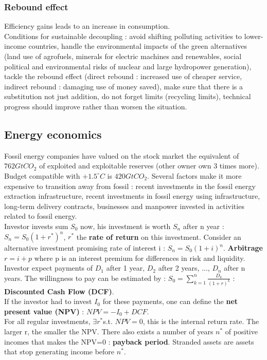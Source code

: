 \documentclass[../main.tex]{subfiles}
\begin{document}
\subsubsection{Rebound effect}
Efficiency gains leads to an increase in consumption. \\

Conditions for sustainable decoupling : avoid shifting polluting activities to lower-income countries, handle the environmental impacts of the green alternatives (land use of agrofuels, minerals for electric machines and renewables, social political and environmental risks of nuclear and large hydropower generation), tackle the rebound effect (direct rebound : increased use of cheaper service, indirect rebound : damaging use of money saved), make sure that there is a substitution not just addition, do not forget limits (recycling limits), technical progress should improve rather than worsen the situation.\\

\subsection{Energy economics}
Fossil energy companies have valued on the stock market the equivalent of $762GtCO_2$ of exploited and exploitable reserves (other owner own 3 times more). Budget compatible with $+1.5^\circ C$ is $420GtCO_2$. Several factors make it more expensive to transition away from fossil : recent investments in the fossil energy extraction infrastructure, recent investments in fossil energy using infrastructure, long-term delivery contracts, businesses and manpower invested in activities related to fossil energy. \\

Investor invests sum $S_0$ now, his investment is worth $S_n$ after n year : $S_n = S_0(1+r^*)^n$, $r^*$ the \textbf{rate of return} on this investment. Consider an alternative investment promising rate of interest i : $S_n = S_0(1+i)^n$. \textbf{Arbitrage} $r=i+p$ where p is an interest premium for differences in risk and liquidity.\\

Investor expect payments of $D_1$ after 1 year, $D_2$ after 2 years, ..., $D_n$ after n years. The willingness to pay can be estimated by : $S_0 = \sum_{k=1}^n \frac{D_k}{(1+r)^k}$ : \textbf{Discounted Cash Flow (DCF)}.\\
If the investor had to invest $I_0$ for these payments, one can define the \textbf{net present value (NPV)} : $NPV = -I_0+DCF$.\\
For all regular investments, $\exists r^* $s.t. $NPV=0$, this is the internal return rate. The larger r, the smaller the NPV. There also exists a number of years $n^*$ of positive incomes that makes the NPV=0 : \textbf{payback period}. Stranded assets are assets that stop generating income before $n^*$.\\
\end{document}
